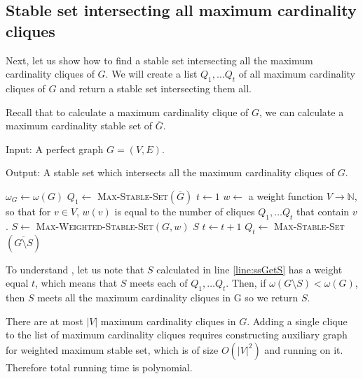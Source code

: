 \subsection{Stable set intersecting all maximum cardinality cliques}
Next, let us show how to find a stable set intersecting all the maximum cardinality cliques of $G$. We will create a list $Q_1, \ldots Q_t$ of all maximum cardinality cliques of $G$ and return a stable set intersecting them all.

Recall that to calculate a maximum cardinality clique of $G$, we can calculate a maximum cardinality stable set of $\overline{G}$.
\begin{alg}
  \label{alg:ssIntersectingCliques}
  Input: A perfect graph $G = (V, E)$.

  \noindent Output: A stable set which intersects all the maximum cardinality cliques of $G$.
\end{alg}

\begin{algorithmic}[1]
    \ls $\omega_G \gets \omega(G)$
    \ls $Q_1 \gets$ \textsc{Max-Stable-Set}$(\overline{G})$
    \ls $t \gets 1$
      \ls $w \gets$ a weight function $V \rightarrow \mathbb{N}$, so that for $v \in V$, $w(v)$ is equal to
      \lsx the number of cliques $Q_1, \ldots Q_t$ that contain $v$.
      \ls $S \gets$ \textsc{Max-Weighted-Stable-Set}$(G, w)$ \label{line:ssGetS}
        \ls \RETURN $S$
      \mElse
        \ls $t \gets t+1$ \vspace{-.1cm}
        \ls $Q_t \gets$ \textsc{Max-Stable-Set}$(\overline{G \setminus S})$
      \mEndIf
    \mEndWhile
  \mEndProcedure
\end{algorithmic}

To understand , let us note that $S$ calculated in line \ref{line:ssGetS} has a weight equal $t$, which means that $S$ meets each of $Q_1, \ldots Q_t$. Then, if $\omega(G \setminus S) < \omega(G)$, then $S$ meets all the maximum cardinality cliques in G so we return $S$.

There are at most $|V|$ maximum cardinality cliques in $G$. Adding a single clique to the list of maximum cardinality cliques requires constructing auxiliary graph for weighted maximum stable set, which is of size $O(|V|^2)$ and running  on it. Therefore total running time is polynomial.

